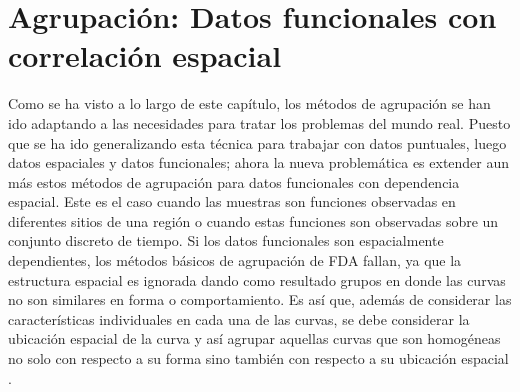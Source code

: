 \documentclass[
]{book}
\begin{document}
\hypertarget{agrupaciuxf3n-datos-funcionales-con-correlaciuxf3n-espacial}{%
\section{Agrupación: Datos funcionales con correlación espacial}\label{agrupaciuxf3n-datos-funcionales-con-correlaciuxf3n-espacial}}

Como se ha visto a lo largo de este capítulo, los métodos de agrupación se han ido adaptando a las necesidades para tratar los problemas del mundo real. Puesto que se ha ido generalizando esta técnica para trabajar con datos puntuales, luego datos espaciales y datos funcionales; ahora la nueva problemática es extender aun más estos métodos de agrupación para datos funcionales con dependencia espacial. Este es el caso cuando las muestras son funciones observadas en diferentes sitios de una región o cuando estas funciones son observadas sobre un conjunto discreto de tiempo. Si los datos funcionales son espacialmente dependientes, los métodos básicos de agrupación de FDA fallan, ya que la estructura espacial es ignorada dando como resultado grupos en donde las curvas no son similares en forma o comportamiento. Es así que, además de considerar las características individuales en cada una de las curvas, se debe considerar la ubicación espacial de la curva y así agrupar aquellas curvas que son homogéneas no solo con respecto a su forma sino también con respecto a su ubicación espacial \citep{Romano}.
\end{document}
